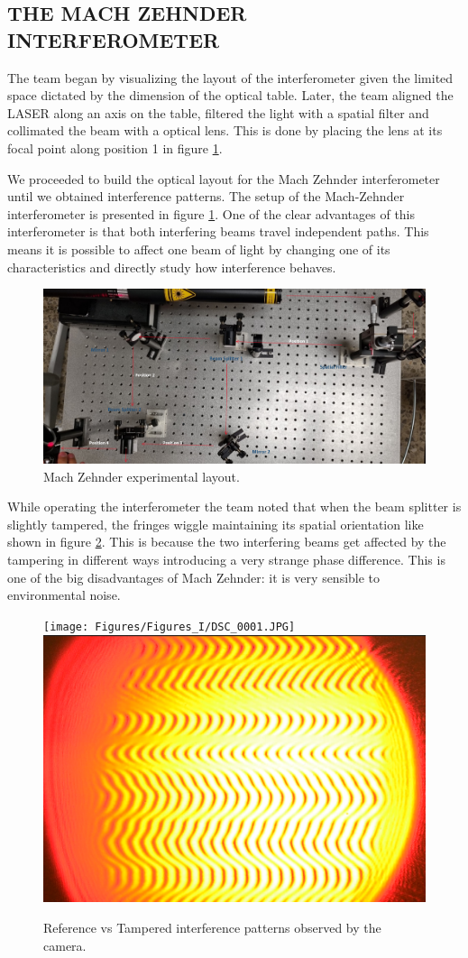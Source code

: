 \label{sec:RESULTS}

\subsection{THE MACH ZEHNDER INTERFEROMETER}
The team began by visualizing the layout of the interferometer given the limited space dictated by the dimension of the optical table. Later, the team aligned the LASER along an axis on the table, filtered the light with a spatial filter and collimated the beam with a optical lens. This is done by placing the lens at its focal point along position 1 in figure \ref{fig:Setup_MZ}. 

We proceeded to build the optical layout for the Mach Zehnder interferometer until we obtained interference patterns. The setup of the Mach-Zehnder interferometer is presented in figure \ref{fig:Setup_MZ}. One of the clear advantages of this interferometer is that both interfering beams travel independent paths. This means it is possible to affect one beam of light by changing one of its characteristics and directly study how interference behaves. 

\begin{figure}[H]
    \centering
    \includegraphics[scale=0.20]{Figures/Figures_I/Mach_Zehnder_ExperimentalSetup.png}
    \caption{Mach Zehnder experimental layout.}
    \label{fig:Setup_MZ}
\end{figure}

While operating the interferometer the team noted that when the beam splitter is slightly tampered, the fringes wiggle maintaining its spatial orientation like shown in figure \ref{fig:Tampered_MZ}. This is because the two interfering beams get affected by the tampering in different ways introducing a very strange phase difference. This is one of the big disadvantages of Mach Zehnder: it is very sensible to environmental noise.

\begin{figure} [H]
    \texttt{[image: Figures/Figures\_I/DSC\_0001.JPG]}\hfill
    \includegraphics[width=.20\textwidth]{Figures/Figures_I/Tampered_MZ.png}\hfill
    \caption{Reference vs Tampered interference patterns observed by the camera.}
    \label{fig:Tampered_MZ}
\end{figure}

